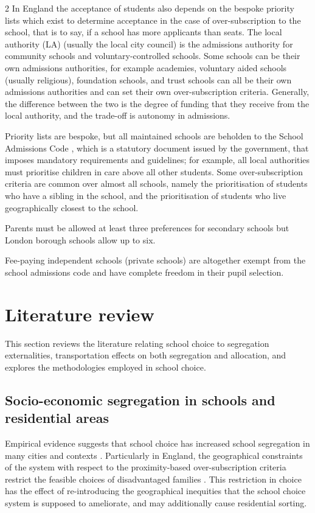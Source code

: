 \documentclass{article}
\begin{document}
\begin{multicols}{2}
In England the acceptance of students also depends on the bespoke priority lists which exist to determine acceptance in the case of over-subscription to the school, that is to say, if a school has more applicants than seats. The local authority (LA) (usually the local city council) is the admissions authority for community schools and voluntary-controlled schools. Some schools can be their own admissions authorities, for example academies, voluntary aided schools (usually religious), foundation schools, and trust schools can all be their own admissions authorities and can set their own over-subscription criteria. Generally, the difference between the two is the degree of funding that they receive from the local authority, and the trade-off is autonomy in admissions.

Priority lists are bespoke, but all maintained schools are beholden to the School Admissions Code \cite{SchoolAdmissionsCode}, which is a statutory document issued by the government, that imposes mandatory requirements and guidelines; for example, all local authorities must prioritise children in care above all other students. Some over-subscription criteria are common over almost all schools, namely the prioritisation of students who have a sibling in the school, and the prioritisation of students who live geographically closest to the school.

Parents must be allowed at least three preferences for secondary schools but London borough schools allow up to six. 

Fee-paying independent schools (private schools) are altogether exempt from the school admissions code and have complete freedom in their pupil selection.

\section{Literature review}
This section reviews the literature relating school choice to segregation externalities, transportation effects on both segregation and allocation, and explores the methodologies employed in school choice.

\subsection{Socio-economic segregation in schools and residential areas}
Empirical evidence suggests that school choice has increased school segregation in many cities and contexts \cite{wilsonSchoolChoiceCity2019}. Particularly in England, the geographical constraints of the system with respect to the proximity-based over-subscription criteria restrict the feasible choices of disadvantaged families \cite{burgessParentalChoicePrimary2011a,burgessSchoolChoiceEngland2019}. This restriction in choice has the effect of re-introducing the geographical inequities that the school choice system is supposed to ameliorate, and may additionally cause residential sorting. 


\end{multicols}
\end{document}
